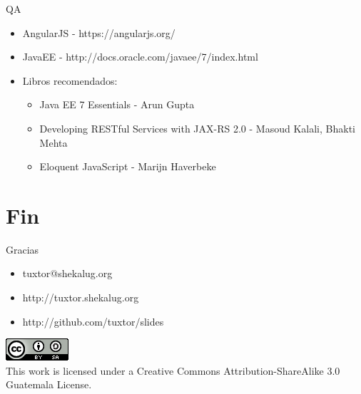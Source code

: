 \documentclass{beamer}
\begin{document}
\begin{frame}{QA}
	\begin{itemize}
		\item AngularJS - https://angularjs.org/
		\item JavaEE - http://docs.oracle.com/javaee/7/index.html
		\item Libros recomendados:
		\begin{itemize}
			\item Java EE 7 Essentials - Arun Gupta
			\item Developing RESTful Services with JAX-RS 2.0 - Masoud Kalali, Bhakti Mehta
			\item Eloquent JavaScript - Marijn Haverbeke
		\end{itemize}
	\end{itemize}
\end{frame}



\section{Fin}

\begin{frame}{Gracias}
\begin{itemize}
\item tuxtor@shekalug.org
\item http://tuxtor.shekalug.org
\item http://github.com/tuxtor/slides
\end{itemize}
\begin{center}
\includegraphics[width=0.1\linewidth]{Images/cclogo}
\\
This work is licensed under a Creative Commons Attribution-ShareAlike 3.0 Guatemala License.
\end{center}
\end{frame}
\end{document}
